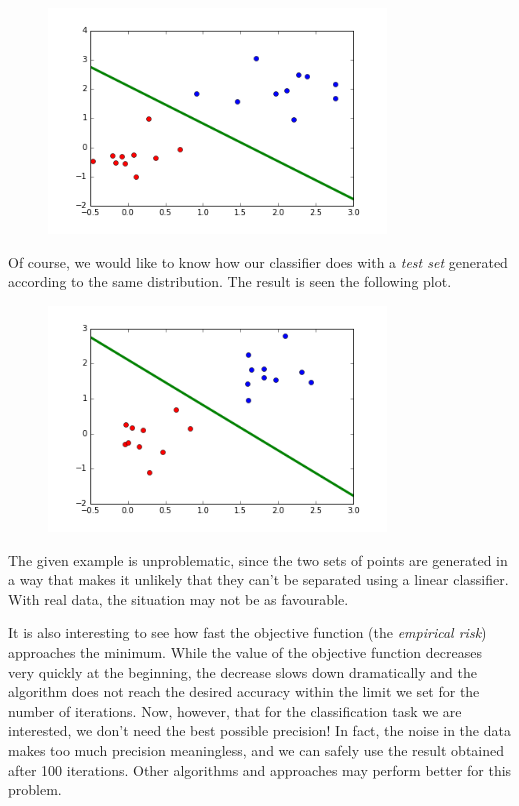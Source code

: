 \begin{example}
\begin{figure}[h!]
\centering
\includegraphics[width=0.8\textwidth]{images/logloss.png}
\end{figure}

Of course, we would like to know how our classifier does with a {\em test set} generated according to the same distribution. The result is seen the following plot.

\begin{figure}[h!]
\centering
\includegraphics[width=0.8\textwidth]{images/testcloud.png}
\end{figure}

The given example is unproblematic, since the two sets of points are generated in a way that makes it unlikely that they can't be separated using a linear classifier. With real data, the situation may not be as favourable.

It is also interesting to see how fast the objective function (the {\em empirical risk}) approaches the minimum. While the value of the objective function decreases very quickly at the beginning, the decrease slows down dramatically and the algorithm does not reach the desired accuracy within the limit we set for the number of iterations. Now, however, that for the classification task we are interested, we don't need the best possible precision! In fact, the noise in the data makes too much precision meaningless, and we can safely use the result obtained after 100 iterations. Other algorithms and approaches may perform better for this problem.


\end{example}
